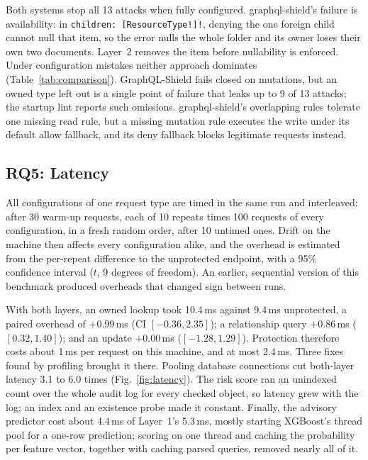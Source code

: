 \documentclass[conference]{IEEEtran}
\newcommand{\code}[1]{\texttt{\small #1}}
\begin{document}
Both systems stop all 13 attacks when fully configured. graphql-shield's failure is availability: in \code{children: [ResourceType!]!}, denying the one foreign child cannot null that item, so the error nulls the whole folder and its owner loses their own two documents. Layer~2 removes the item before nullability is enforced. Under configuration mistakes neither approach dominates (Table~\ref{tab:comparison}). GraphQL-Shield fails closed on mutations, but an owned type left out is a single point of failure that leaks up to 9 of 13 attacks; the startup lint reports such omissions. graphql-shield's overlapping rules tolerate one missing read rule, but a missing mutation rule executes the write under its default allow fallback, and its deny fallback blocks legitimate requests instead.

\subsection{RQ5: Latency}
All configurations of one request type are timed in the same run and interleaved: after 30 warm-up requests, each of 10 repeats times 100 requests of every configuration, in a fresh random order, after 10 untimed ones. Drift on the machine then affects every configuration alike, and the overhead is estimated from the per-repeat difference to the unprotected endpoint, with a 95\% confidence interval ($t$, 9 degrees of freedom). An earlier, sequential version of this benchmark produced overheads that changed sign between runs.

With both layers, an owned lookup took 10.4\,ms against 9.4\,ms unprotected, a paired overhead of $+0.99$\,ms (CI $[-0.36, 2.35]$); a relationship query $+0.86$\,ms ($[0.32, 1.40]$); and an update $+0.00$\,ms ($[-1.28, 1.29]$). Protection therefore costs about 1\,ms per request on this machine, and at most 2.4\,ms. Three fixes found by profiling brought it there. Pooling database connections cut both-layer latency 3.1 to 6.0 times (Fig.~\ref{fig:latency}). The risk score ran an unindexed count over the whole audit log for every checked object, so latency grew with the log; an index and an existence probe made it constant. Finally, the advisory predictor cost about 4.4\,ms of Layer~1's 5.3\,ms, mostly starting XGBoost's thread pool for a one-row prediction; scoring on one thread and caching the probability per feature vector, together with caching parsed queries, removed nearly all of it.
\end{document}

